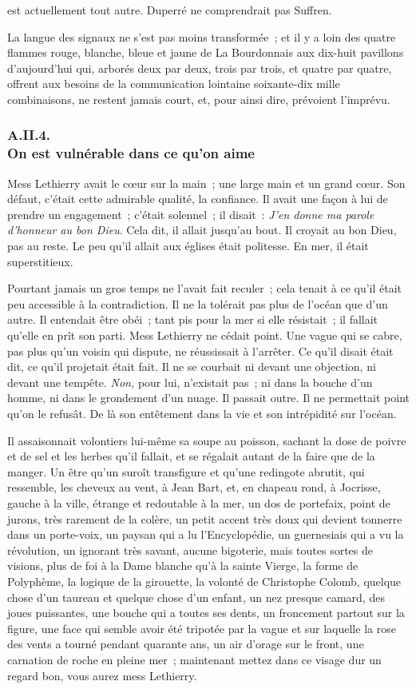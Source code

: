 \documentclass[french,twoside]{book} %
\begin{document}
est actuellement tout autre. Duperré ne comprendrait pas Suffren.\par
La langue des signaux ne s’est pas moins transformée ; et il y a loin des quatre flammes rouge, blanche, bleue et jaune de La Bourdonnais aux dix-huit pavillons d’aujourd’hui qui, arborés deux par deux, trois par trois, et quatre par quatre, offrent aux besoins de la communication lointaine soixante-dix mille combinaisons, ne restent jamais court, et, pour ainsi dire, prévoient l’imprévu.
 \subsubsection[{A.II.4. On est vulnérable dans ce qu’on aime}]{A.II.4. \\
On est vulnérable dans ce qu’on aime}
\noindent Mess Lethierry avait le cœur sur la main ; une large main et un grand cœur. Son défaut, c’était cette admirable qualité, la confiance. Il avait une façon à lui de prendre un engagement ; c’était solennel ; il disait : \emph{J’en donne ma parole d’honneur au bon Dieu}. Cela dit, il allait jusqu’au bout. Il croyait au bon Dieu, pas au reste. Le peu qu’il allait aux églises était politesse. En mer, il était superstitieux.\par
Pourtant jamais un gros temps ne l’avait fait reculer ; cela tenait à ce qu’il était peu accessible à la contradiction. Il ne la tolérait pas plus de l’océan que d’un autre. Il entendait être obéi ; tant pis pour la mer si elle résistait ; il fallait qu’elle en prît son parti. Mess Lethierry ne cédait point. Une vague qui se cabre, pas plus qu’un voisin qui dispute, ne réussissait à l’arrêter. Ce qu’il disait était dit, ce qu’il projetait était fait. Il ne se courbait ni devant une objection, ni devant une tempête. \emph{Non,} pour lui, n’existait pas ; ni dans la  bouche d’un homme, ni dans le grondement d’un nuage. Il passait outre. Il ne permettait point qu’on le refusât. De là son entêtement dans la vie et son intrépidité sur l’océan.\par
Il assaisonnait volontiers lui-même sa soupe au poisson, sachant la dose de poivre et de sel et les herbes qu’il fallait, et se régalait autant de la faire que de la manger. Un être qu’un suroît transfigure et qu’une redingote abrutit, qui ressemble, les cheveux au vent, à Jean Bart, et, en chapeau rond, à Jocrisse, gauche à la ville, étrange et redoutable à la mer, un dos de portefaix, point de jurons, très rarement de la colère, un petit accent très doux qui devient tonnerre dans un porte-voix, un paysan qui a lu l’Encyclopédie, un guernesiais qui a vu la révolution, un ignorant très savant, aucune bigoterie, mais toutes sortes de visions, plus de foi à la Dame blanche qu’à la sainte Vierge, la forme de Polyphème, la logique de la girouette, la volonté de Christophe Colomb, quelque chose d’un taureau et quelque chose d’un enfant, un nez presque camard, des joues puissantes, une bouche qui a toutes ses dents, un froncement partout sur la figure, une face qui semble avoir été tripotée par la vague et sur laquelle la rose des vents a tourné pendant quarante ans, un air d’orage sur le front, une carnation de roche en pleine mer ; maintenant mettez dans ce visage dur un regard bon, vous aurez mess Lethierry.\par
\end{document}
